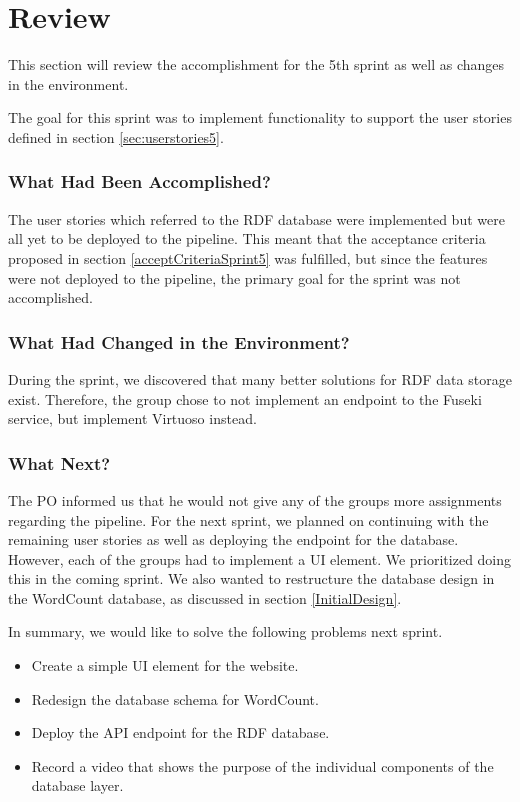 \section{Review}
This section will review the accomplishment for the 5th sprint as well as changes in the \knox{} environment. 

The goal for this sprint was to implement functionality to support the user stories defined in section \ref{sec:userstories5}. 

\subsubsection*{What Had Been Accomplished?}
The user stories which referred to the RDF database were implemented but were all yet to be deployed to the \knox{} pipeline. This meant that the acceptance criteria proposed in section \ref{acceptCriteriaSprint5} was fulfilled, but since the features were not deployed to the pipeline, the primary goal for the sprint was not accomplished. 

\subsubsection*{What Had Changed in the Environment?}
During the sprint, we discovered that many better solutions for RDF data storage exist. Therefore, the group chose to not implement an endpoint to the Fuseki service, but implement Virtuoso instead. 

\subsubsection*{What Next?}
The \knox{} PO informed us that he would not give any of the \knox{} groups more assignments regarding the pipeline. 
For the next sprint, we planned on continuing with the remaining user stories as well as deploying the endpoint for the database.
However, each of the \knox{} groups had to implement a UI element. We prioritized doing this in the coming sprint.
We also wanted to restructure the database design in the WordCount database, as discussed in section \ref{InitialDesign}.


In summary, we would like to solve the following problems next sprint.

\begin{itemize}
    \item Create a simple UI element for the \knox{} website.
    \item Redesign the database schema for WordCount.
    \item Deploy the API endpoint for the RDF database.
    \item Record a video that shows the purpose of the individual components of the database layer.
\end{itemize}

